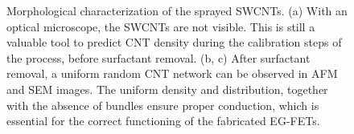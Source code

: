 \begin{figure}
    \centering
    \quad
    \quad
    \caption{Morphological characterization of the sprayed SWCNTs. (a) With an optical microscope, the SWCNTs are not visible. This is still a valuable tool to predict CNT density during the calibration steps of the process, before surfactant removal. (b, c) After surfactant removal, a uniform random CNT network can be observed in AFM and SEM images. The uniform density and distribution, together with the absence of bundles ensure proper conduction, which is essential for the correct functioning of the fabricated EG-FETs.}
    \label{fig:morphoCNT}
\end{figure}
